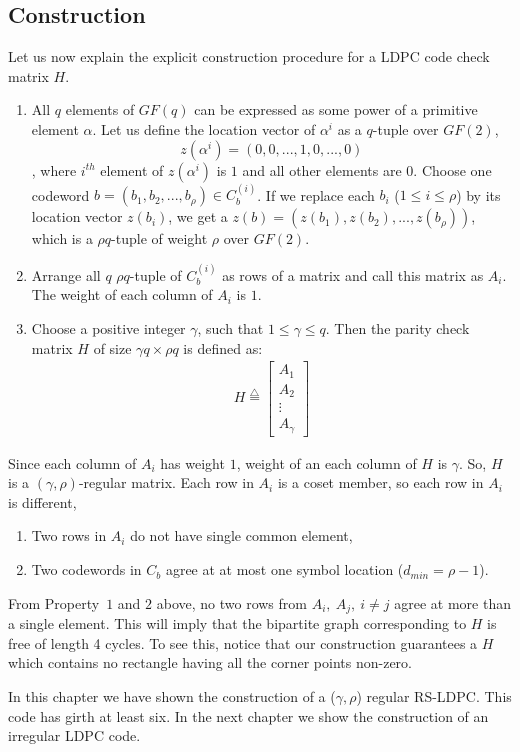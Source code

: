 \subsection{Construction}
Let us now explain the explicit construction procedure for a LDPC code check matrix $H$.
\begin{enumerate}
\item All $q$ elements of $GF(q)$ can be expressed as some power of a primitive element $\alpha$. Let us define the location vector of $\alpha^i$ as a $q$-tuple over $GF(2)$, $$z(\alpha^i)=(0,0,...,1,0,...,0)$$, where $i^{th}$ element of $z(\alpha^i)$ is $1$ and all other elements are $0$. Choose one codeword $b=(b_1,b_2,...,b_{\rho}) \in C_b^{(i)}$. If we replace each $b_i$ ($1 \leq i \leq \rho $) by its location vector $z(b_i)$, we get a $z(b)=(z(b_1),z(b_2),...,z(b_{\rho}))$, which is a $ \rho q$-tuple of weight $\rho$ over $GF(2)$.
\item Arrange all $q$ $\rho q$-tuple of $C_b^{(i)}$ as rows of a matrix and call this matrix as $A_i$. The weight of each column of $A_i$ is $1$. 
\item Choose a positive integer $\gamma$, such that $1 \leq \gamma \leq q$. Then the parity check matrix $H$ of size $\gamma q \times \rho q$ is defined as:
\begin{align}
 H \overset{\triangle}{=}  \begin{bmatrix}
A_1\\
A_2\\
\vdots\\
A_{\gamma} \end{bmatrix} 
\end{align}
\end{enumerate}
Since each column of $A_i$ has weight $1$, weight of an each column of $H$ is $\gamma$. So, $H$ is a $(\gamma , \rho)$-regular matrix. Each row in $A_i$ is a coset member, so each row in $A_i$ is different,
\begin{enumerate}
\item Two rows in $A_i$ do not have single common element, 
\item Two codewords in $C_b$ agree at at most one symbol location ($d_{min}=\rho-1$). 
\end{enumerate}
From Property~$1$ and $2$ above, no two rows from $A_i,~A_j,~i\neq j$ agree at more than a single element. This will imply that the bipartite graph corresponding to $H$ is free of length 4 cycles. To see this, notice that our construction guarantees a $H$ which contains no rectangle having all the corner points non-zero. 

In this chapter we have shown the construction of a ($\gamma,\rho$) regular RS-LDPC. This code has girth at least six. In the next chapter we show the construction of an irregular LDPC code.